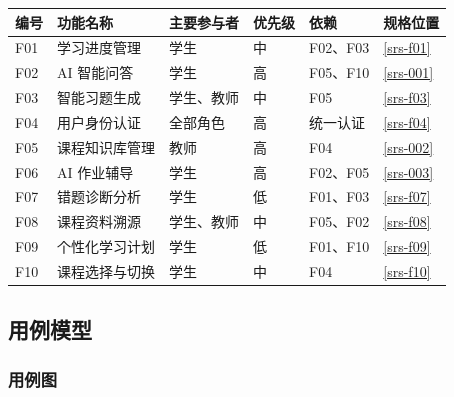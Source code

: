 \documentclass[12pt,a4paper]{ctexart}
\begin{document}
\begin{longtable}{@{}C{1.0cm}L{3.6cm}L{2.4cm}C{1.0cm}L{3.4cm}L{2.2cm}@{}}
  \toprule
  \textbf{编号} & \textbf{功能名称} & \textbf{主要参与者} & \textbf{优先级} & \textbf{依赖} & \textbf{规格位置} \\
  \midrule
  \endhead
  F01 & 学习进度管理 & 学生 & 中 & F02、F03 & \ref{srs-f01} \\
  F02 & AI 智能问答 & 学生 & 高 & F05、F10 & \ref{srs-001} \\
  F03 & 智能习题生成 & 学生、教师 & 中 & F05 & \ref{srs-f03} \\
  F04 & 用户身份认证 & 全部角色 & 高 & 统一认证 & \ref{srs-f04} \\
  F05 & 课程知识库管理 & 教师 & 高 & F04 & \ref{srs-002} \\
  F06 & AI 作业辅导 & 学生 & 高 & F02、F05 & \ref{srs-003} \\
  F07 & 错题诊断分析 & 学生 & 低 & F01、F03 & \ref{srs-f07} \\
  F08 & 课程资料溯源 & 学生、教师 & 中 & F05、F02 & \ref{srs-f08} \\
  F09 & 个性化学习计划 & 学生 & 低 & F01、F10 & \ref{srs-f09} \\
  F10 & 课程选择与切换 & 学生 & 中 & F04 & \ref{srs-f10} \\
  \bottomrule
\end{longtable}

\subsection{用例模型}

\subsubsection{用例图}
\end{document}
